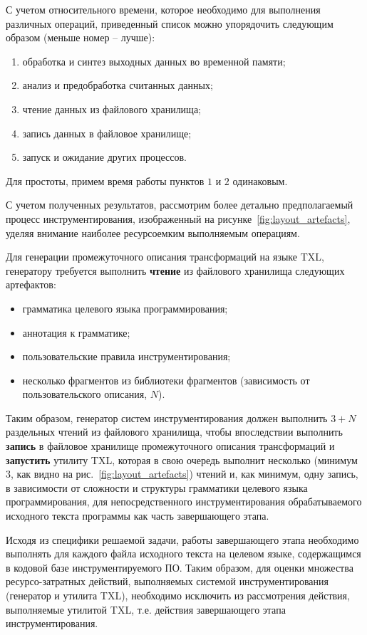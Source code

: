 С учетом относительного времени, которое необходимо для выполнения различных операций, приведенный список можно упорядочить следующим образом (меньше номер -- лучше):
\begin{enumerate}[noitemsep]
  \item обработка и синтез выходных данных во временной памяти;
  \item анализ и предобработка считанных данных;
  \item чтение данных из файлового хранилища;
  \item запись данных в файловое хранилище;
  \item запуск и ожидание других процессов.
\end{enumerate}

Для простоты, примем время работы пунктов $1$ и $2$ одинаковым.

С учетом полученных результатов, рассмотрим более детально предполагаемый процесс инструментирования, изображенный на рисунке~\ref{fig:layout_artefacts}, уделяя внимание наиболее ресурсоемким выполняемым операциям.

Для генерации промежуточного описания трансформаций на языке TXL, генератору требуется выполнить \textbf{чтение} из файлового хранилища следующих артефактов:
\begin{itemize}[noitemsep]
  \item грамматика целевого языка программирования;
  \item аннотация к грамматике;
  \item пользовательские правила инструментирования;
  \item несколько фрагментов из библиотеки фрагментов (зависимость от пользовательского описания, $N$).
\end{itemize}

Таким образом, генератор систем инструментирования должен выполнить $3 + N$ раздельных чтений из файлового хранилища, чтобы впоследствии выполнить \textbf{запись} в файловое хранилище промежуточного описания трансформаций и \textbf{запустить} утилиту TXL, которая в свою очередь выполнит несколько (минимум $3$, как видно на рис.~\ref{fig:layout_artefacts}) чтений и, как минимум, одну запись, в зависимости от сложности и структуры грамматики целевого языка программирования, для непосредственного инструментирования обрабатываемого исходного текста программы как часть завершающего этапа.

Исходя из специфики решаемой задачи, работы завершающего этапа необходимо выполнять для каждого файла исходного текста на целевом языке, содержащимся в кодовой базе инструментируемого ПО.
Таким образом, для оценки множества ресурсо-затратных действий, выполняемых системой инструментирования (генератор и утилита TXL), необходимо исключить из рассмотрения действия, выполняемые утилитой TXL, т.е. действия завершающего этапа инструментирования.

